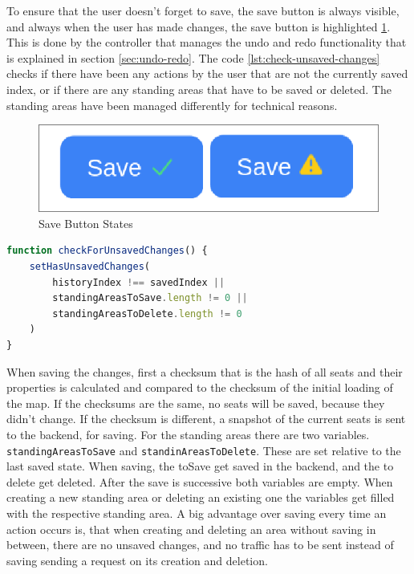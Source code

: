 To ensure that the user doesn't forget to save, the save button is always visible, and always when the user has made changes, the save button is highlighted \ref{fig:save-button-states}. This is done by the controller that manages the undo and redo functionality that is explained in section \ref{sec:undo-redo}. The code \ref{lst:check-unsaved-changes} checks if there have been any actions by the user that are not the currently saved index, or if there are any standing areas that have to be saved or deleted. The standing areas have been managed differently for technical reasons.

\begin{figure}
    \centering
    \includegraphics[scale=0.4]{pics/save-button-states.png}
    \caption{Save Button States}
    \label{fig:save-button-states}
\end{figure}

\begin{lstlisting}[language=TypeScript, caption=Check for Unsaved Changes, label=lst:check-unsaved-changes]
function checkForUnsavedChanges() {
    setHasUnsavedChanges(
        historyIndex !== savedIndex ||
        standingAreasToSave.length != 0 ||
        standingAreasToDelete.length != 0
    )
}
\end{lstlisting}

When saving the changes, first a checksum that is the hash of all seats and their properties is calculated and compared to the checksum of the initial loading of the map. If the checksums are the same, no seats will be saved, because they didn't change. If the checksum is different, a snapshot of the current seats is sent to the backend, for saving. For the standing areas there are two variables. \texttt{standingAreasToSave} and \texttt{standinAreasToDelete}. These are set relative to the last saved state. When saving, the toSave get saved in the backend, and the to delete get deleted. After the save is successive both variables are empty. When creating a new standing area or deleting an existing one the variables get filled with the respective standing area. A big advantage over saving every time an action occurs is, that when creating and deleting an area without saving in between, there are no unsaved changes, and no traffic has to be sent instead of saving sending a request on its creation and deletion. 